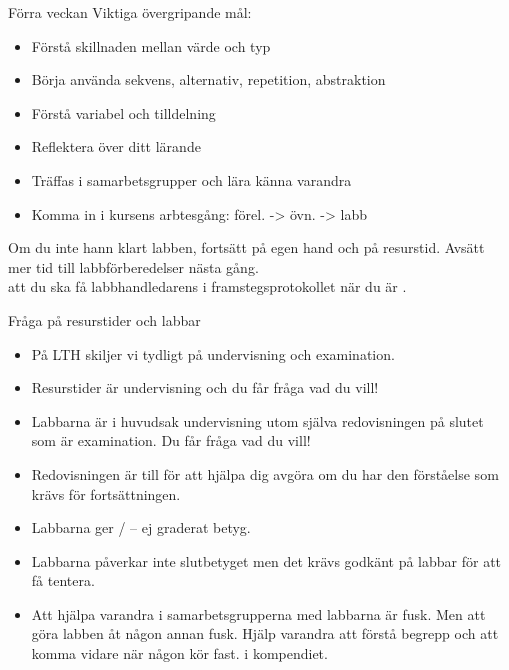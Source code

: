 

\begin{SlideExtra}{Förra veckan}
Viktiga övergripande mål:
\begin{itemize}
\item Förstå skillnaden mellan värde och typ
\item Börja använda sekvens, alternativ, repetition, abstraktion
\item Förstå variabel och tilldelning
\item Reflektera över ditt lärande
\item Träffas i samarbetsgrupper och lära känna varandra
\item Komma in i kursens arbtesgång: förel. -> övn. -> labb
\end{itemize}
Om du inte hann klart labben, fortsätt på egen hand och på resurstid. Avsätt mer tid till labbförberedelser nästa gång.
\\ 
 att du ska få labbhandledarens  i framstegsprotokollet när du är .
\end{SlideExtra}

\begin{SlideExtra}{Fråga på resurstider och labbar}
\begin{itemize}
  \item På LTH skiljer vi tydligt på undervisning och examination.
  \item Resurstider är undervisning och du får fråga vad du vill!
  \item Labbarna är i huvudsak undervisning utom själva redovisningen på slutet som är examination. Du får fråga vad du vill!
  \item Redovisningen är till för att hjälpa dig avgöra om du har den förståelse som krävs för fortsättningen.
  \item Labbarna ger / -- ej graderat betyg. 
  \item Labbarna påverkar inte slutbetyget men det krävs godkänt på  labbar för att få tentera.
  \item Att hjälpa varandra i samarbetsgrupperna med labbarna är  fusk. Men att göra labben åt någon annan  fusk. Hjälp varandra att förstå begrepp och att komma vidare när någon kör fast.  i kompendiet.
\end{itemize}  
\end{SlideExtra}



